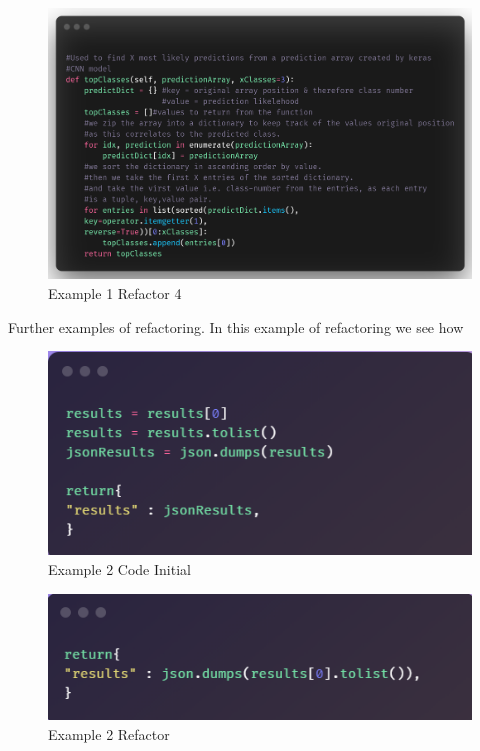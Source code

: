      \begin{figure}[H]
        \begin{center}
          \includegraphics[scale=0.75]{Images/Refactor/refactorA4}
          \caption{Example 1 Refactor 4}
          \label{fig:refactorA3}
        \end{center}
      \end{figure}

      Further examples of refactoring. In this example of refactoring we see how
      \begin{figure}[H]
        \begin{center}
          \includegraphics[scale=0.5]{Images/Refactor/refactorB1}
          \caption{Example 2 Code Initial}
          \label{fig:refactorA3}
        \end{center}
      \end{figure}

      \begin{figure}[H]
        \begin{center}
          \includegraphics[scale=0.5]{Images/Refactor/refactorB2}
          \caption{Example 2 Refactor}
          \label{fig:refactorA3}
        \end{center}
      \end{figure}


